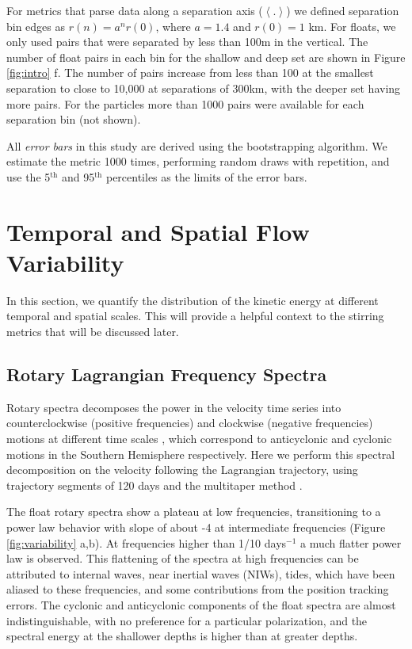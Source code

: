 \documentclass[]{ametsoc}
\begin{document}
For metrics that parse data along a separation axis ($\left< . \right>$) we defined separation bin edges as $r (n) = a^n r (0)$, where $a = 1.4$ and $r (0) = 1$ km. For floats, we only used pairs that were separated by less than 100m in the vertical. The number of float pairs in each bin for the shallow and deep set are shown in Figure \ref{fig:intro} f. The number of pairs increase from less than 100 at the smallest separation to close to 10,000 at separations of 300km, with the deeper set having more pairs. For the particles more than 1000 pairs were available for each separation bin (not shown).  

All \textit{error bars} in this study are derived using the bootstrapping algorithm. We estimate the metric 1000 times, performing random draws with repetition, and use the 5$^\text{th}$ and 95$^\text{th}$ percentiles as the limits of the error bars.

\section{Temporal and Spatial Flow Variability}
In this section, we quantify the distribution of the kinetic energy at different temporal and spatial scales. This will provide a helpful context to the stirring metrics that will be discussed later.

\subsection{Rotary Lagrangian Frequency Spectra}
Rotary spectra decomposes the power in the velocity time series into counterclockwise (positive frequencies) and clockwise (negative frequencies) motions at different time scales \citep{thomson2014data}, which correspond to anticyclonic and cyclonic motions in the Southern Hemisphere respectively. Here we perform this spectral decomposition on the velocity following the Lagrangian trajectory, using trajectory segments of 120 days and the multitaper method \citep{lilly2019jlab}. 

The float rotary spectra show a plateau at low frequencies, transitioning to a power law behavior with slope of about -4 at intermediate frequencies (Figure \ref{fig:variability} a,b). At frequencies higher than 1/10 days$^{-1}$ a much flatter power law is observed. This flattening of the spectra at high frequencies can be attributed to internal waves, near inertial waves (NIWs), tides, which have been aliased to these frequencies, and some contributions from the position tracking errors. The cyclonic and anticyclonic components of the float spectra are almost indistinguishable, with no preference for a particular polarization, and the spectral energy at the shallower depths is  higher than at greater depths. 
\end{document}
